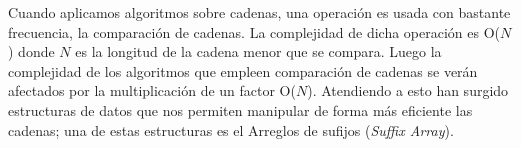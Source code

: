 Cuando aplicamos algoritmos sobre cadenas, una operación es usada con bastante frecuencia, la comparación de cadenas. La complejidad de dicha operación es O($N$) donde $N$ es la longitud de la cadena menor que se compara. Luego la complejidad de los algoritmos que empleen comparación de cadenas se verán afectados por la multiplicación de un factor O($N$). Atendiendo a esto han surgido estructuras de datos que nos permiten manipular de forma más eficiente las cadenas; una de estas estructuras es el Arreglos de sufijos (\emph{Suffix Array}).